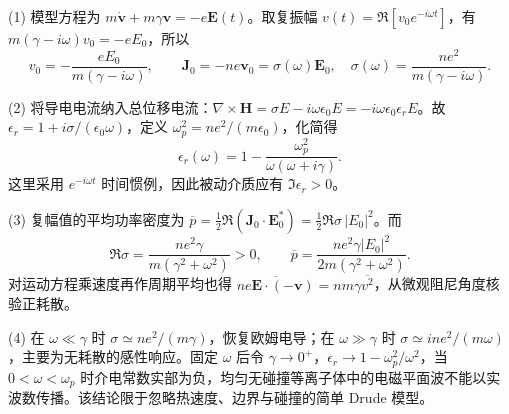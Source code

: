 (1) 模型方程为 \(m\dot{\boldsymbol v}+m\gamma\boldsymbol v=-e\boldsymbol E(t)\)。取复振幅 \(v(t)=\Re[v_0e^{-i\omega t}]\)，有 \(m(\gamma-i\omega)v_0=-eE_0\)，所以
\[
v_0=-\frac{eE_0}{m(\gamma-i\omega)},\qquad
\boldsymbol J_0=-ne\boldsymbol v_0
=\sigma(\omega)\boldsymbol E_0,\quad
\sigma(\omega)=\frac{ne^2}{m(\gamma-i\omega)}.
\]

(2) 将导电电流纳入总位移电流：\(\nabla\times\boldsymbol H=\sigma E-i\omega\epsilon_0E=-i\omega\epsilon_0\epsilon_r E\)。故 \(\epsilon_r=1+i\sigma/(\epsilon_0\omega)\)，定义 \(\omega_p^2=ne^2/(m\epsilon_0)\)，化简得
\[
\epsilon_r(\omega)=1-\frac{\omega_p^2}{\omega(\omega+i\gamma)}.
\]
这里采用 \(e^{-i\omega t}\) 时间惯例，因此被动介质应有 \(\Im\epsilon_r>0\)。

(3) 复幅值的平均功率密度为 \(\overline p=\frac12\Re(\boldsymbol J_0\cdot\boldsymbol E_0^*)=\frac12\Re\sigma\,|E_0|^2\)。而
\[
\Re\sigma=\frac{ne^2\gamma}{m(\gamma^2+\omega^2)}>0,\qquad
\overline p=\frac{ne^2\gamma|E_0|^2}{2m(\gamma^2+\omega^2)}.
\]
对运动方程乘速度再作周期平均也得 \(\overline{ne\boldsymbol E\cdot(-\boldsymbol v)}=nm\gamma\overline{v^2}\)，从微观阻尼角度核验正耗散。

(4) 在 \(\omega\ll\gamma\) 时 \(\sigma\simeq ne^2/(m\gamma)\)，恢复欧姆电导；在 \(\omega\gg\gamma\) 时 \(\sigma\simeq i ne^2/(m\omega)\)，主要为无耗散的感性响应。固定 \(\omega \) 后令 \(\gamma \to 0^{+}\)，\(\epsilon_r\to1-\omega_p^2/\omega^2\)，当 \(0<\omega<\omega_p\) 时介电常数实部为负，均匀无碰撞等离子体中的电磁平面波不能以实波数传播。该结论限于忽略热速度、边界与碰撞的简单 Drude 模型。
